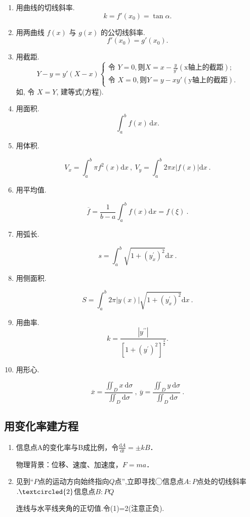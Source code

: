 \begin{enumerate}
    \item 用曲线的切线斜率.
          $$k = f'(x_0) = \tan \alpha.$$
    \item 用两曲线 $f(x)$ 与 $g(x)$ 的公切线斜率.
          $$f'(x_0) = g'(x_0).$$
    \item 用截距.
          $$Y - y = y'(X - x) \begin{cases} \text{令 } Y = 0, 则 X = x - \frac{y}{y'} (\text{x轴上的截距}); \\ \text{令 } X = 0, 则 Y = y - xy' (\text{y轴上的截距}). \end{cases}$$
          如, 令 $X = Y$, 建等式(方程).
    \item 用面积.
          $$
              \int_a^b f(x) \, \mathrm{d}x.$$
    \item 用体积.

          $$V_{x}=\int_{a}^{b}\pi f^{2}(x)\mathrm{d}x\:,\:V_{y}=\int_{a}^{b}2\pi x\big|f(x)\big|\mathrm{d}x\:.$$

    \item 用平均值.


          $$\overline{f}=\frac{1}{b-a}\int_{a}^{b}f(x)\mathrm{d}x=f(\xi)\:.$$

    \item 用弧长.

          $$s=\int_{a}^{b}\sqrt{1+\left(y_{x}^{\prime}\right)^{2}}\mathrm{d}x\:.$$

    \item 用侧面积.


          $$S=\int_{a}^{b}2\pi\big|y(x)\big|\sqrt{1+(y_{x}^{\prime})^{2}}\mathrm{d}x\:.$$

    \item 用曲率.
          $$k=\frac{|y^{\prime\prime}|}{\left[1+(y^{\prime})^2\right]^{\frac{3}{2}}}.$$

    \item 用形心.

          $$\overline{x}=\frac{\iint_Dx\:\mathrm{d}\sigma}{\iint_D\mathrm{d}\sigma}\:,\:\overline{y}=\frac{\iint_Dy\:\mathrm{d}\sigma}{\iint_D\mathrm{d}\sigma}\:.$$
\end{enumerate}
\subsection{用变化率建方程}
\DThree
\begin{enumerate}
    \item  信息点A的变化率与B成比例，令$\frac{\mathrm{d}A}{\mathrm{d}t}=\pm kB$．

          物理背景：位移、速度、加速度，$F=ma$．
    \item 见到“$P$点的运动方向始终指向$Q$点”,立即寻找◯信息点$A:P$点处的切线斜率$.\textcircled{2}$信息点$B:PQ$

          连线与水平线夹角的正切值.令(1)=2(注意正负).
\end{enumerate}


